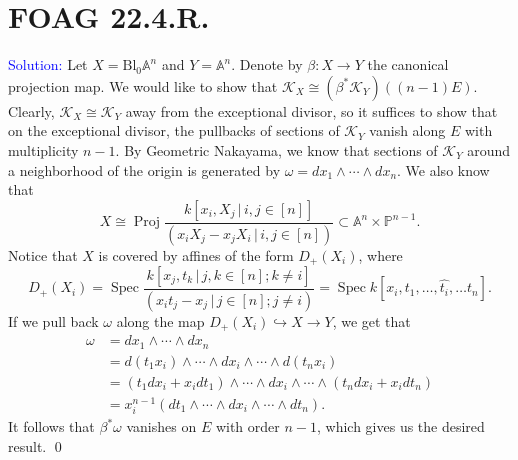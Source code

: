 \documentclass[11pt]{article}
\renewcommand{\AA}{\mathbb{A}}
\newcommand{\PP}{\mathbb{P}}
\newcommand{\cK}{\mathcal{K}}
\DeclareMathOperator{\Spec}{\operatorname{Spec}}
\newcommand{\Proj}{\operatorname{Proj}}
\newcommand{\Bl}{\mathrm{Bl}}
\newenvironment{solution}{\begin{trivlist}\item[]{\textcolor{blue}{Solution:}}}{\qed \end{trivlist}}
\begin{document}
\newpage

\section*{FOAG 22.4.R.}

\begin{solution}
    Let $X = \Bl_0 \AA^n$ and $Y = \AA^n$. Denote by $\beta: X \rightarrow Y$ the canonical projection map. We would like to show that $\cK_X \cong (\beta^* \cK_Y)((n-1)E)$. Clearly, $\cK_X \cong \cK_Y$ away from the exceptional divisor, so it suffices to show that on the exceptional divisor, the pullbacks of sections of $\cK_Y$ vanish along $E$ with multiplicity $n-1$. By Geometric Nakayama, we know that sections of $\cK_Y$ around a neighborhood of the origin is generated by $\omega = dx_1 \wedge \cdots \wedge dx_n$. We also know that 
    \[
        X \cong \Proj \frac{k[x_i, X_j \, | \, i,j \in [n]]}{(x_i X_j - x_j X_i \, | \, i,j \in [n])} \subset \AA^n \times \PP^{n-1}.
    \]
    Notice that $X$ is covered by affines of the form $D_+(X_i)$, where 
    \[
        D_+(X_i)
        = \Spec \frac{k[x_j, t_k \, | \, j,k \in [n]; k \neq i]}{(x_i t_j - x_j \, | \, j \in [n]; j \neq i)} 
        = \Spec k[x_i, t_1, \ldots, \widehat{t_i}, \ldots t_n].
    \]
    If we pull back $\omega$ along the map $D_+(X_i) \hookrightarrow X \rightarrow Y$, we get that 
    \begin{align*}
        \omega 
        &= dx_1 \wedge \cdots \wedge dx_n \\
        &= d(t_1 x_i) \wedge \cdots \wedge dx_i \wedge \cdots \wedge d(t_nx_i) \\
        &= (t_1 dx_i + x_i dt_1) \wedge \cdots \wedge dx_i \wedge \cdots \wedge (t_n dx_i + x_i dt_n) \\
        &= x_i^{n-1} (dt_1 \wedge \cdots \wedge dx_i \wedge \cdots \wedge dt_n).
    \end{align*}
    It follows that $\beta^* \omega$ vanishes on $E$ with order $n-1$, which gives us the desired result. 
\end{solution}
\end{document}
